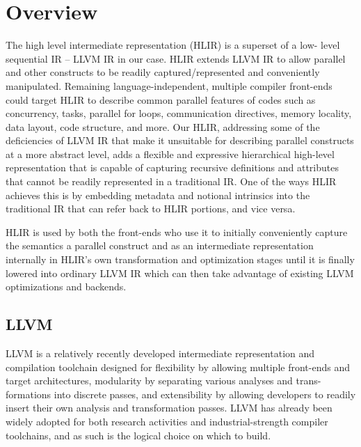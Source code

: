 \documentclass[12pt]{article}
\begin{document}
\maketitle

\section{Overview}

The high level intermediate representation (HLIR) is a superset of a low- level sequential IR -- LLVM IR in our case. HLIR extends LLVM IR to allow parallel and other constructs to be readily captured/represented and conveniently manipulated. Remaining language-independent, multiple compiler front-ends could target HLIR to describe common parallel features of codes such as concurrency, tasks, parallel for loops, communication directives, memory locality, data layout, code structure, and more. Our HLIR, addressing some of the deficiencies of LLVM IR that make it unsuitable for describing parallel constructs at a more abstract level, adds a flexible and expressive hierarchical high-level representation that is capable of capturing recursive definitions and attributes that cannot be readily represented in a traditional IR. One of the ways HLIR achieves this is by embedding metadata and notional intrinsics into the traditional IR that can refer back to HLIR portions, and vice versa.

HLIR is used by both the front-ends who use it to initially conveniently capture the semantics a parallel construct and as an intermediate representation internally in HLIR's own transformation and optimization stages until it is finally lowered into ordinary LLVM IR which can then take advantage of existing LLVM optimizations and backends.

\subsection{LLVM}

LLVM is a relatively recently developed intermediate representation and compilation toolchain designed for flexibility by allowing multiple front-ends and target architectures, modularity by separating various analyses and trans- formations into discrete passes, and extensibility by allowing developers to readily insert their own analysis and transformation passes. LLVM has already been widely adopted for both research activities and industrial-strength compiler toolchains, and as such is the logical choice on which to build.
\end{document}

